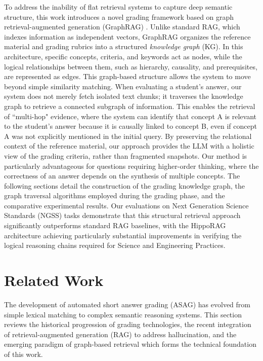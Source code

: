 \documentclass{edm_article}
\begin{document}
To address the inability of flat retrieval systems to capture deep semantic structure, this work introduces a novel grading framework based on graph retrieval-augmented generation (GraphRAG) \cite{han2025reasoning}. Unlike standard RAG, which indexes information as independent vectors, GraphRAG organizes the reference material and grading rubrics into a structured \textit{knowledge graph} (KG). In this architecture, specific concepts, criteria, and keywords act as nodes, while the logical relationships between them, such as hierarchy, causality, and prerequisites, are represented as edges. This graph-based structure allows the system to move beyond simple similarity matching. When evaluating a student's answer, our system does not merely fetch isolated text chunks; it traverses the knowledge graph to retrieve a connected subgraph of information. This enables the retrieval of ``multi-hop" evidence, where the system can identify that concept A is relevant to the student's answer because it is causally linked to concept B, even if concept A was not explicitly mentioned in the initial query. By preserving the relational context of the reference material, our approach provides the LLM with a holistic view of the grading criteria, rather than fragmented snapshots. Our method is particularly advantageous for questions requiring higher-order thinking, where the correctness of an answer depends on the synthesis of multiple concepts. The following sections detail the construction of the grading knowledge graph, the graph traversal algorithms employed during the grading phase, and the comparative experimental results. Our evaluations on Next Generation Science Standards (NGSS) tasks demonstrate that this structural retrieval approach significantly outperforms standard RAG baselines, with the HippoRAG architecture achieving particularly substantial improvements in verifying the logical reasoning chains required for Science and Engineering Practices.


\section{Related Work}

The development of automated short answer grading (ASAG) has evolved from simple lexical matching to complex semantic reasoning systems. This section reviews the historical progression of grading technologies, the recent integration of retrieval-augmented generation (RAG) to address hallucination, and the emerging paradigm of graph-based retrieval which forms the technical foundation of this work.
\end{document}
